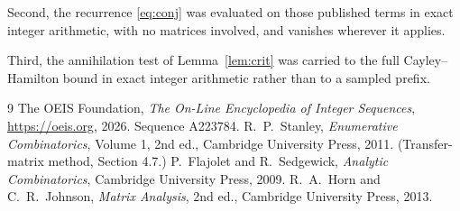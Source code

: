 \documentclass[11pt,a4paper]{article}
\theoremstyle{plain}
\theoremstyle{definition}
\begin{document}
Second, the recurrence \eqref{eq:conj} was evaluated on those published terms in exact
integer arithmetic, with no matrices involved, and vanishes wherever it applies.

Third, the annihilation test of Lemma~\ref{lem:crit} was carried to the full
Cayley--Hamilton bound in exact integer arithmetic rather than to a sampled prefix.

\begin{thebibliography}{9}
 The OEIS Foundation, \emph{The On-Line Encyclopedia of Integer
Sequences}, \url{https://oeis.org}, 2026. Sequence A223784.
 R.~P.~Stanley, \emph{Enumerative Combinatorics}, Volume 1, 2nd ed.,
Cambridge University Press, 2011. (Transfer-matrix method, Section 4.7.)
 P.~Flajolet and R.~Sedgewick, \emph{Analytic Combinatorics}, Cambridge
University Press, 2009.
 R.~A.~Horn and C.~R.~Johnson, \emph{Matrix Analysis}, 2nd ed., Cambridge
University Press, 2013.
\end{thebibliography}
\end{document}
